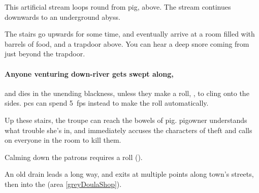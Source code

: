 \begin{multicols}{2}

This artificial stream loops round from \gls{pig}, above.
The stream continues downwards to an underground abyss.

\begin{boxtext}
  The stairs go upwards for some time, and eventually arrive at a room filled with barrels of food, and a trapdoor above.
  You can hear a deep snore coming from just beyond the trapdoor.
\end{boxtext}

\paragraph{Anyone venturing down-river gets swept along,}
and dies in the unending blackness, unless they make a  roll, \tn[10], to cling onto the sides.
\Glspl{pc} can spend 5~\glspl{fp} instead to make the roll automatically.


Up these stairs, the troupe can reach the bowels of \gls{pig}.
\Gls{pigowner} understands what trouble she's in, and immediately accuses the characters of theft and calls on everyone in the room to kill them.

Calming down the patrons requires a  roll (\tn[10]).


An old drain leads a long way, and exits at multiple points along \gls{town}'s streets, then into the  (area \vref{greyDoulaShop}).

\end{multicols}

